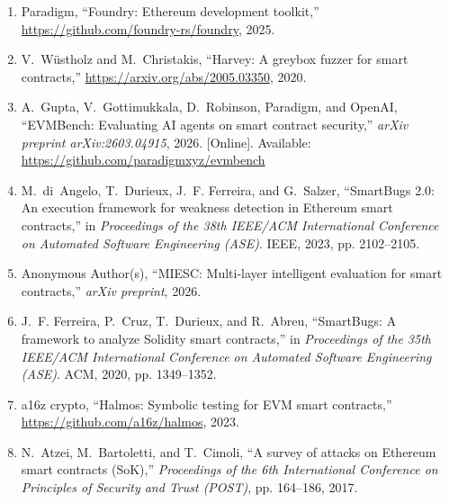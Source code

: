 \documentclass[conference]{IEEEtran}
\begin{document}
\begin{enumerate}
\item {Paradigm}, ``Foundry: {Ethereum} development toolkit,'' \url{https://github.com/foundry-rs/foundry}, 2025.
\item V.~W{\"u}stholz and M.~Christakis, ``Harvey: A greybox fuzzer for smart contracts,'' \url{https://arxiv.org/abs/2005.03350}, 2020.
\item A.~Gupta, V.~Gottimukkala, D.~Robinson, Paradigm, and OpenAI, ``{EVMBench}: Evaluating {AI} agents on smart contract security,'' \emph{arXiv preprint arXiv:2603.04915}, 2026. [Online]. Available: \url{https://github.com/paradigmxyz/evmbench}
\item M.~di~Angelo, T.~Durieux, J.~F. Ferreira, and G.~Salzer, ``{SmartBugs} 2.0: An execution framework for weakness detection in {Ethereum} smart contracts,'' in \emph{Proceedings of the 38th IEEE/ACM International Conference on Automated Software Engineering (ASE)}. IEEE, 2023, pp. 2102--2105.
\item Anonymous Author(s), ``{MIESC}: Multi-layer intelligent evaluation for smart contracts,'' \emph{arXiv preprint}, 2026.
\item J.~F. Ferreira, P.~Cruz, T.~Durieux, and R.~Abreu, ``{SmartBugs}: A framework to analyze {Solidity} smart contracts,'' in \emph{Proceedings of the 35th IEEE/ACM International Conference on Automated Software Engineering (ASE)}. ACM, 2020, pp. 1349--1352.
\item {a16z crypto}, ``Halmos: Symbolic testing for {EVM} smart contracts,'' \url{https://github.com/a16z/halmos}, 2023.
\item N.~Atzei, M.~Bartoletti, and T.~Cimoli, ``A survey of attacks on {Ethereum} smart contracts ({SoK}),'' \emph{Proceedings of the 6th International Conference on Principles of Security and Trust (POST)}, pp. 164--186, 2017.
\end{enumerate}
\end{document}
